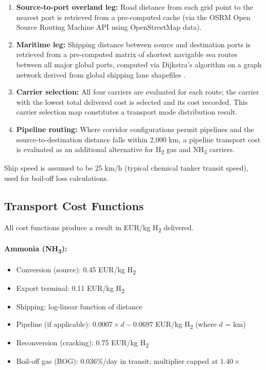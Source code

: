 \begin{enumerate}
    \item \textbf{Source-to-port overland leg:} Road distance from each grid point to the nearest port is retrieved from a pre-computed cache (via the OSRM Open Source Routing Machine API using OpenStreetMap data).
    \item \textbf{Maritime leg:} Shipping distance between source and destination ports is retrieved from a pre-computed matrix of shortest navigable sea routes between all major global ports, computed via Dijkstra's algorithm on a graph network derived from global shipping lane shapefiles \citep{Collis2022}.
    \item \textbf{Carrier selection:} All four carriers are evaluated for each route; the carrier with the lowest total delivered cost is selected and its cost recorded. This carrier selection map constitutes a transport mode distribution result.
    \item \textbf{Pipeline routing:} Where corridor configurations permit pipelines and the source-to-destination distance falls within 2{,}000 km, a pipeline transport cost is evaluated as an additional alternative for H\textsubscript{2} gas and NH\textsubscript{3} carriers.
\end{enumerate}

Ship speed is assumed to be 25 km/h (typical chemical tanker transit speed), used for boil-off loss calculations.

\subsection{Transport Cost Functions}

All cost functions produce a result in EUR/kg H\textsubscript{2} delivered.

\paragraph{Ammonia (NH\textsubscript{3}):}
\begin{itemize}
    \item Conversion (source): 0.45 EUR/kg H\textsubscript{2}
    \item Export terminal: 0.11 EUR/kg H\textsubscript{2}
    \item Shipping: log-linear function of distance
    \item Pipeline (if applicable): $0.0007 \times d - 0.0697$ EUR/kg H\textsubscript{2} (where $d$ = km)
    \item Reconversion (cracking): 0.75 EUR/kg H\textsubscript{2}
    \item Boil-off gas (BOG): 0.036\%/day in transit; multiplier capped at $1.40\times$
\end{itemize}

